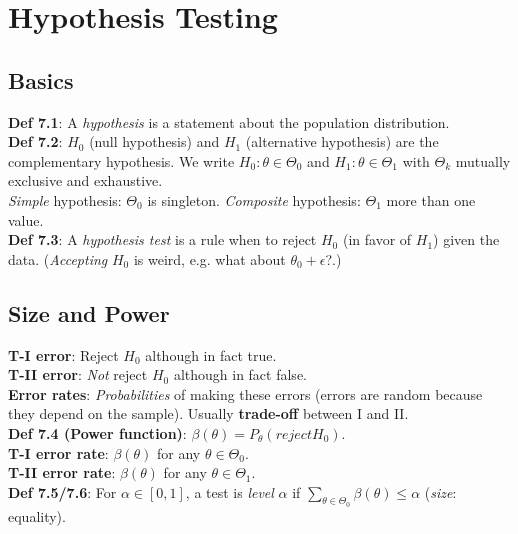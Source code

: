 \section{Hypothesis Testing}
\subsection{Basics}
\textbf{Def 7.1}: A \emph{hypothesis} is a statement about the population distribution.\\
\textbf{Def 7.2}: $H_0$ (null hypothesis) and $H_1$ (alternative hypothesis) are the complementary hypothesis. We write $H_0:\theta\in\Theta_0$ and $H_1:\theta\in\Theta_1$ with $\Theta_k$ mutually exclusive and exhaustive.\\
\emph{Simple} hypothesis: $\Theta_0$ is singleton. \emph{Composite} hypothesis: $\Theta_1$ more than one value.\\
\textbf{Def 7.3}: A \emph{hypothesis test} is a rule when to reject $H_0$ (in favor of $H_1$) given the data. \footnotesize{(\textit{Accepting} $H_0$ is weird, e.g. what about $\theta_0+\epsilon$?.)}\\

\subsection{Size and Power}
\textbf{T-I error}: Reject $H_0$ although in fact true.\\
\textbf{T-II error}: \emph{Not} reject $H_0$ although in fact false.\\
\textbf{Error rates}: \emph{Probabilities} of making these errors \footnotesize{(errors are random because they depend on the sample)}. Usually \textbf{trade-off} between I and II.\\
\textbf{Def 7.4 (Power function)}: $\beta(\theta) = P_\theta(reject H_0)$.\\
\textbf{T-I error rate}: $\beta(\theta)$ for any $\theta\in\Theta_0$.\\
\textbf{T-II error rate}: $\beta(\theta)$ for any $\theta\in\Theta_1$.\\
\textbf{Def 7.5/7.6}: For $\alpha\in[0,1]$, a test is \emph{level} $\alpha$ if $\sum_{\theta\in\Theta_0}\beta(\theta)\leq\alpha$ (\emph{size}: equality).\\

